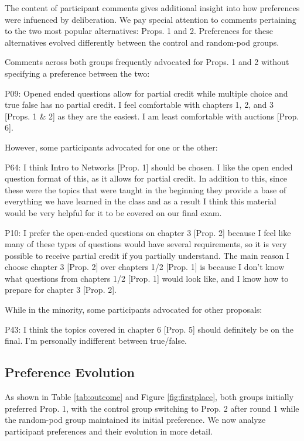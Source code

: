 {The content of participant comments gives additional insight into how preferences were infuenced by deliberation.
We pay special attention to comments pertaining to the two most popular alternatives: Props. 1 and 2.
Preferences for these alternatives evolved differently between the control and random-pod groups.

Comments across both groups frequently advocated for Props. 1 and 2 without specifying a preference between the two:
\begin{displayquote}
P09: Opened ended questions allow for partial credit while multiple choice and true false has no partial credit. I feel comfortable with chapters 1, 2, and 3 [Props. 1 \& 2] as they are the easiest. I am least comfortable with auctions [Prop. 6].
\end{displayquote}
However, some participants advocated for one or the other:
\begin{displayquote}
P64: I think Intro to Networks [Prop. 1] should be chosen. I like the open ended question format of this, as it allows for partial credit. In addition to this, since these were the topics that were taught in the beginning they provide a base of everything we have learned in the class and as a result I think this material would be very helpful for it to be covered on our final exam.
\end{displayquote}
\begin{displayquote}
P10: I prefer the open-ended questions on chapter 3 [Prop. 2] because I feel like many of these types of questions would have several requirements, so it is very possible to receive partial credit if you partially understand. The main reason I choose chapter 3 [Prop. 2] over chapters 1/2 [Prop. 1] is because I don't know what questions from chapters 1/2 [Prop. 1] would look like, and I know how to prepare for chapter 3 [Prop. 2].
\end{displayquote}
While in the minority, some participants advocated for other proposals:
\begin{displayquote}
P43: I think the topics covered in chapter 6 [Prop. 5] should definitely be on the final. I'm personally indifferent between true/false.
\end{displayquote}


\subsection{Preference Evolution}

As shown in Table \ref{tab:outcome} and Figure \ref{fig:firstplace}, both groups initially preferred Prop. 1, with the control group switching to Prop. 2 after round 1 while the random-pod group maintained its initial preference.
We now analyze participant preferences and their evolution in more detail.

}
